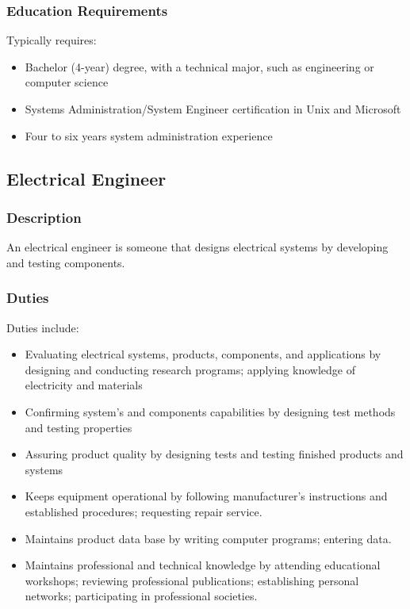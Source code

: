 \documentclass[11pt]{article}
\begin{document}
\subsubsection*{Education Requirements}
\label{sec:org422538e}

Typically requires:
\begin{itemize}
\item Bachelor (4-year) degree, with a technical major, such as engineering or computer science
\item Systems Administration/System Engineer certification in Unix and Microsoft
\item Four to six years system administration experience
\end{itemize}

\subsection*{Electrical Engineer}
\label{sec:org59efc4d}

\subsubsection*{Description}
\label{sec:orgb49f28c}

An electrical engineer is someone that designs electrical systems by developing and testing components.

\subsubsection*{Duties}
\label{sec:org07d59fe}

Duties include:
\begin{itemize}
\item Evaluating electrical systems, products, components, and applications by designing and conducting research programs; applying knowledge of electricity and materials
\item Confirming system's and components capabilities by designing test methods and testing properties
\item Assuring product quality by designing tests and testing finished products and systems
\item Keeps equipment operational by following manufacturer's instructions and established procedures; requesting repair service.
\item Maintains product data base by writing computer programs; entering data.
\item Maintains professional and technical knowledge by attending educational workshops; reviewing professional publications; establishing personal networks; participating in professional societies.
\end{itemize}
\end{document}
